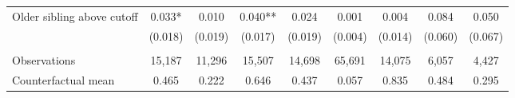 {{\begin{tabular}{lcccccccc}
Older sibling above cutoff&       0.033*  &       0.010   &       0.040** &       0.024   &       0.001   &       0.004   &       0.084   &       0.050   \\
                    &     (0.018)   &     (0.019)   &     (0.017)   &     (0.019)   &     (0.004)   &     (0.014)   &     (0.060)   &     (0.067)   \\
                    &               &               &               &               &               &               &               &               \\
Observations        &      15,187   &      11,296   &      15,507   &      14,698   &      65,691   &      14,075   &       6,057   &       4,427   \\
Counterfactual mean &       0.465   &       0.222   &       0.646   &       0.437   &       0.057   &       0.835   &       0.484   &       0.295   \\
 

\bottomrule
\end{tabular}
}
}
